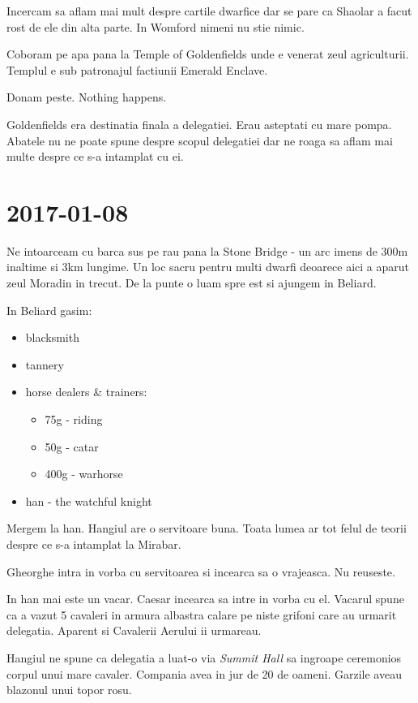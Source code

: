 \documentclass[12pt,oneside]{book}
\begin{document}
Incercam sa aflam mai mult despre cartile dwarfice dar se pare ca Shaolar a
facut rost de ele din alta parte. In Womford nimeni nu stie nimic.

Coboram pe apa pana la Temple of Goldenfields unde e venerat zeul 
agriculturii. Templul e sub patronajul factiunii Emerald Enclave. 

Donam peste. Nothing happens.

Goldenfields era destinatia finala a delegatiei. Erau asteptati cu mare
pompa. Abatele nu ne poate spune despre scopul delegatiei dar ne roaga
sa aflam mai multe despre ce s-a intamplat cu ei. 

\section{2017-01-08}

Ne intoarceam cu barca sus pe rau pana la Stone Bridge - un arc imens de 300m
inaltime si 3km lungime. Un loc sacru pentru multi dwarfi deoarece aici a aparut
zeul Moradin in trecut.
De la punte o luam spre est si ajungem in Beliard.

In Beliard gasim:
\begin{itemize}
	\item blacksmith
	\item tannery
	\item horse dealers & trainers:
		\begin{itemize}
			\item 75g - riding
			\item 50g - catar
			\item 400g - warhorse
		\end{itemize}
	\item han - the watchful knight
\end{itemize}

Mergem la han. Hangiul are o servitoare buna.
Toata lumea ar tot felul de teorii despre ce s-a intamplat la Mirabar.

Gheorghe intra in vorba cu servitoarea si incearca sa o vrajeasca. Nu reuseste.

In han mai este un vacar. Caesar incearca sa intre in vorba cu el.
Vacarul spune ca a vazut 5 cavaleri in armura albastra calare pe niste 
grifoni care au urmarit delegatia. Aparent si Cavalerii Aerului ii urmareau.

Hangiul ne spune ca delegatia a luat-o via \textit{Summit Hall} sa ingroape 
ceremonios corpul unui mare cavaler. Compania avea in jur de 20 de oameni. Garzile 
aveau blazonul unui topor rosu.
\end{document}
